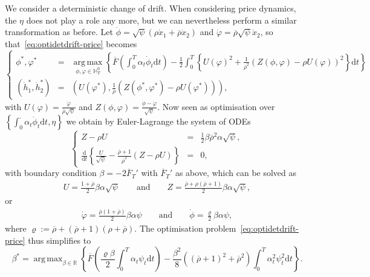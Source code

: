 \documentclass{amsart}[11pt]
\numberwithin{equation}{section}
\numberwithin{theorem}{subsection}
\numberwithin{proposition}{subsection}
\numberwithin{definition}{subsection}
\numberwithin{lemma}{subsection}
\numberwithin{assumption}{subsection}
\newcommand{\HH}{\mathbb{H}}
\newcommand{\RR}{\mathbb{R}}
\newcommand{\brho}{\overline{\rho}}
\newcommand{\D}{\mathrm{d}}
\DeclareMathOperator*{\argmax}{arg\,max}
\begin{document}
We consider a deterministic change of drift.
When considering price dynamics, the $\eta$ does not play a role any more, but we can nevertheless perform a similar transformation as before. Let ${\dot{\phi} = \sqrt{\psi}\left( \rho \dot{x}_1 + \brho\dot{x}_2 \right)}$ and
$\dot{\varphi} = \brho\sqrt{\psi}\dot{x}_2$,
so that~\eqref{eq:optidetdrift-price} becomes
\begin{equation}\label{eq:optidetdriftapplication-price}
\left\{
\begin{array}{rcl}
\phi^{*}, \varphi^{*} &=& \displaystyle 
\argmax\limits_{\phi,\varphi \in \HH_T^0} \left\{ \overline{F}\left(\int_0^T \alpha_t \dot{\phi}_t \D t \right)- \frac{1}{2} \int_0^T \left\{U(\varphi)^2 + \frac{1}{\brho^2}\left(Z(\phi,\varphi) - \rho U(\varphi)\right)^2\right \}\D t \right\} \\
\left(\dot{h}^{*}_1,  \dot{h}^{*}_2\right) &=& 
\displaystyle \left(U(\varphi^{*}), 
\frac{1}{\brho}\left(Z(\phi^{*}, \varphi^{*}) - \rho U(\varphi^{*})\right)\right),
\end{array}
\right.
\end{equation}
with
$U(\varphi) = \frac{\dot{\varphi}}{\brho\sqrt{\psi}}$ and
$Z(\phi, \varphi) = \frac{\dot{\phi}-\dot{\varphi}}{\sqrt{\psi}}$.
Now seen as optimisation over $\left \{\int_{0}^{\cdot} \alpha_t \dot{\phi}_t \D t, \eta\right \}$ we obtain by Euler-Lagrange the system of ODEs 
\begin{equation*}
\left\{
\begin{array}{rcl}
Z - \rho U &=& \displaystyle \frac{1}{2}\beta\brho^2\alpha \sqrt{\psi}, \\
\displaystyle\frac{\D}{\D t}\left\{\frac{U}{\sqrt{\psi}} - \frac{\brho+1}{\brho^2} (Z - \rho U) \right \} &=& 0,
\end{array}
\right.
\end{equation*}
with boundary condition $\beta = - 2\overline{F}_T'$ with $\overline{F}_T'$ as above,
which can be solved as
\begin{align*}
U = \frac{1+\brho}{2}\beta\alpha\sqrt{\psi}
\qquad \text{and} \qquad 
Z=\frac{\brho + \rho(\brho+1)}{2}\beta\alpha\sqrt{\psi},
\end{align*}
or
\begin{align*}
\dot{\varphi} = \frac{\brho(1+\brho)}{2}\beta\alpha\psi
\qquad \text{and} \qquad
\dot{\phi} = \frac{\varrho}{2}\beta\alpha\psi,
\end{align*}
where $\varrho := \brho + (\brho+1)(\rho+\brho)$. The optimisation problem~\eqref{eq:optidetdrift-price} thus simplifies to
\[
\beta^{*} = \argmax_{\beta\in\RR} 
\left\{\overline{F}\left(
\frac{\varrho\beta}{2}\int_0^T\alpha_t\psi_t\D t \right )
- \frac{\beta^2}{8}\left((\brho+1)^2+\brho^2\right)\int_0^T\alpha_t^2\psi_t^2 \D t\right\}.
\]
\end{document}
